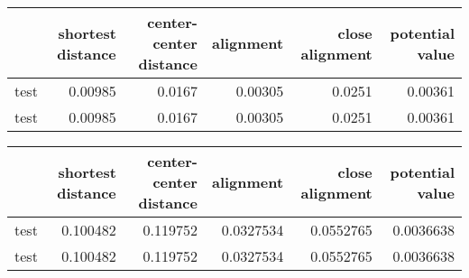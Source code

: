 \begin{tabular}{lrrrrr}
\hline
      &   shortest distance &   center-center distance &   alignment &   close alignment &   potential value \\
\hline
 test &             0.00985 &                   0.0167 &     0.00305 &            0.0251 &           0.00361 \\
 test &             0.00985 &                   0.0167 &     0.00305 &            0.0251 &           0.00361 \\
\hline
\end{tabular}

\begin{tabular}{lrrrrr}
\hline
      &   shortest distance &   center-center distance &   alignment &   close alignment &   potential value \\
\hline
 test &            0.100482 &                 0.119752 &   0.0327534 &         0.0552765 &         0.0036638 \\
 test &            0.100482 &                 0.119752 &   0.0327534 &         0.0552765 &         0.0036638 \\
\hline
\end{tabular}